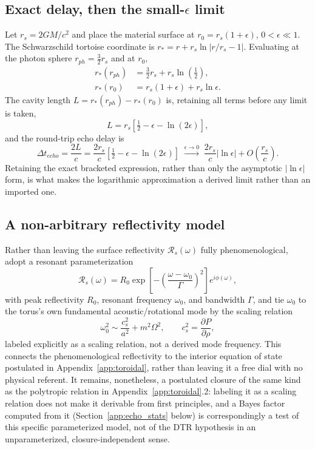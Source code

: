 \documentclass[11pt]{article}
\begin{document}
\subsection{Exact delay, then the small-$\epsilon$ limit}

Let $r_s = 2GM/c^2$ and place the material surface at $r_0 = r_s(1+\epsilon)$, $0<\epsilon\ll1$. The Schwarzschild tortoise coordinate is $r_* = r + r_s\ln\left|r/r_s - 1\right|$. Evaluating at the photon sphere $r_{ph}=\tfrac32 r_s$ and at $r_0$,
\begin{align}
r_*(r_{ph}) &= \tfrac32 r_s + r_s\ln\left(\tfrac12\right), \\
r_*(r_0) &= r_s(1+\epsilon) + r_s\ln\epsilon.
\end{align}
The cavity length $L = r_*(r_{ph}) - r_*(r_0)$ is, retaining all terms before any limit is taken,
\begin{equation}
L = r_s\left[\tfrac12 - \epsilon - \ln(2\epsilon)\right],
\end{equation}
and the round-trip echo delay is
\begin{equation}
\Delta t_{echo} = \frac{2L}{c} = \frac{2r_s}{c}\left[\tfrac12-\epsilon-\ln(2\epsilon)\right] \;\xrightarrow{\epsilon\to0}\; \frac{2r_s}{c}\left|\ln\epsilon\right| + O\!\left(\frac{r_s}{c}\right).
\end{equation}
Retaining the exact bracketed expression, rather than only the asymptotic $|\ln\epsilon|$ form, is what makes the logarithmic approximation a derived limit rather than an imported one.

\subsection{A non-arbitrary reflectivity model}

Rather than leaving the surface reflectivity $\mathcal{R}_s(\omega)$ fully phenomenological, adopt a resonant parameterization
\begin{equation}
\mathcal{R}_s(\omega) = R_0\exp\left[-\left(\frac{\omega-\omega_0}{\Gamma}\right)^2\right]e^{i\phi(\omega)},
\end{equation}
with peak reflectivity $R_0$, resonant frequency $\omega_0$, and bandwidth $\Gamma$, and tie $\omega_0$ to the torus's own fundamental acoustic/rotational mode by the scaling relation
\begin{equation}
\omega_0^2 \sim \frac{c_s^2}{a^2} + m^2\Omega^2, \qquad c_s^2 = \frac{\partial P}{\partial \rho},
\end{equation}
labeled explicitly as a scaling relation, not a derived mode frequency. This connects the phenomenological reflectivity to the interior equation of state postulated in Appendix~\ref{app:toroidal}, rather than leaving it a free dial with no physical referent. It remains, nonetheless, a postulated closure of the same kind as the polytropic relation in Appendix~\ref{app:toroidal}.2: labeling it as a scaling relation does not make it derivable from first principles, and a Bayes factor computed from it (Section~\ref{app:echo_stats} below) is correspondingly a test of this specific parameterized model, not of the DTR hypothesis in an unparameterized, closure-independent sense.
\end{document}
